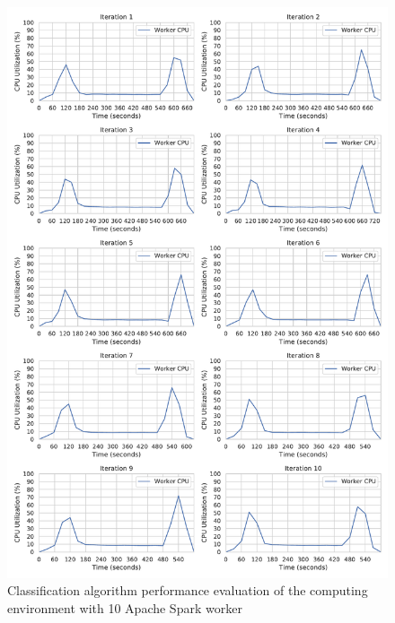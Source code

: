 \begin{figure}[h]
\centering
\includegraphics[scale=0.53]{images/07_evaluation/mortgage/mortgage_10_worker_cpu_performance}
\caption{Classification algorithm performance evaluation of the computing environment with 10 Apache Spark worker}
\label{fig:07_mortgage_static-cpu_results}
\end{figure}

